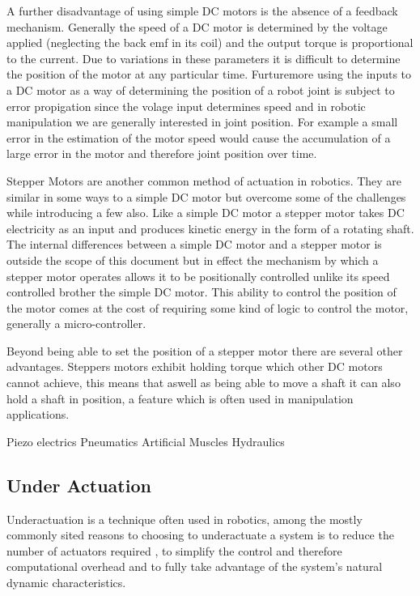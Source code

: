 A further disadvantage of using simple DC motors is the absence of a feedback mechanism. Generally the speed of a DC motor is determined by the voltage applied (neglecting the back emf in its coil) and the output torque is proportional to the current. Due to variations in these parameters it is difficult to determine the position of the motor at any particular time. Furturemore using the inputs to a DC motor as a way of determining the position of a robot joint is subject to error propigation since the volage input determines speed and in robotic manipulation we are generally interested in joint position. For example a small error in the estimation of the motor speed would cause the accumulation of a large error in the motor and therefore joint position over time.

Stepper Motors are another common method of actuation in robotics. They are similar in some ways to a simple DC motor but overcome some of the challenges while introducing a few also. Like a simple DC motor a stepper motor takes DC electricity as an input and produces kinetic energy in the form of a rotating shaft. The internal differences between a simple DC motor and a stepper motor is outside the scope of this document but in effect the mechanism by which a stepper motor operates allows it to be positionally controlled unlike its speed controlled brother the simple DC motor. This ability to control the position of the motor comes at the cost of requiring some kind of logic to control the motor, generally a micro-controller.

Beyond being able to set the position of a stepper motor there are several other advantages. Steppers motors exhibit holding torque which other DC motors cannot achieve, this means that aswell as being able to move a shaft it can also hold a shaft in position, a feature which is often used in manipulation applications.

Piezo electrics
Pneumatics
Artificial Muscles
Hydraulics

\subsection{Under Actuation}
Underactuation is a technique often used in robotics, among the mostly commonly sited reasons to choosing to underactuate a system is to reduce the number of actuators required \cite{UnderactuationReductionInActuactors}, to simplify the control and therefore computational overhead and to fully take advantage of the system's natural dynamic characteristics. 

